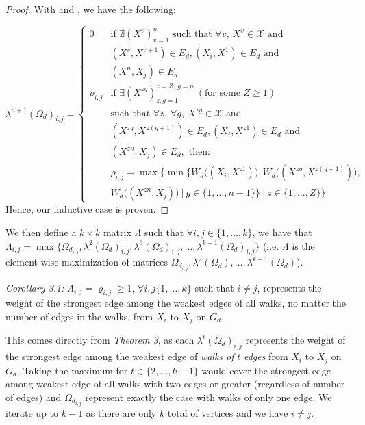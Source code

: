\documentclass{article} %
\newcommand*\circled[1]{\tikz[baseline=(char.base)]{
            \node[shape=circle,draw,inner sep=2pt] (char) {#1};}}
\begin{document}
\begin{proof}
With \circled{1} and \circled{2}, we have the following:

\[
\lambda^{n+1}(\Omega_d)_{i,j}=
\begin{cases}
0 & \textrm{if } \nexists (X^v)_{v=1}^{n} \textrm{ such that } \forall v,\ X^v\in\mathcal{X}\textrm{ and } \\
  & (X^v,X^{v+1})\in E_d, (X_i,X^1)\in E_d \textrm{ and } \\
  & (X^{n},X_j)\in E_d\\ 
\rho_{i,j} & \textrm{if }\exists (X^{zg})_{z,g=1}^{z=Z,\ g=n}\ (\textrm{for some }Z\geq1) \\
  & \textrm{such that }\forall z,\ \forall g,\ X^{zg}\in\mathcal{X} \textrm{ and } \\
  & (X^{zg},X^{z(g+1)})\in E_d, (X_i, X^{z1})\in E_d \textrm{ and } \\
  & (X^{zn},X_j)\in E_d, \textrm{ then: } \\
  & \rho_{i,j}=\max\Big\{\min\big\{W_d\big((X_i,X^{z1})\big),W_d\big((X^{zg},X^{z(g+1)})\big), \\
  & W_d\big((X^{zn},X_j)\big)\ |\ g\in\{1,\ldots,n-1\}\big\}\ |\ z\in\{1,\ldots,Z\}\Big\}
\end{cases}
\]
Hence, our inductive case is proven.
\end{proof}

We then define a $k\times k$ matrix $\Lambda$ such that $\forall i,j\in\{1,\ldots,k\}$, we have that $\Lambda_{i,j}=\max\{\Omega_{d_{i,j}},\lambda^2(\Omega_d)_{i,j},\lambda^3(\Omega_d)_{i,j},\ldots,\lambda^{k-1}(\Omega_d)_{i,j}\}$ (i.e. $\Lambda$ is the element-wise maximization of matrices $\Omega_{d_{i,j}},\lambda^2(\Omega_d),\ldots,\lambda^{k-1}(\Omega_d)$). 

\textit{Corollary 3.1:} $\Lambda_{i,j}=\varrho_{i,j}\geq1$, $\forall i,j\{1,\ldots,k\}$ such that $i\not=j$, represents the weight of the strongest edge among the weakest edges of all walks, no matter the number of edges in the walks, from $X_i$ to $X_j$ on $G_d$.

This comes directly from \textit{Theorem 3}, as each $\lambda^t(\Omega_d)_{i,j}$ represents the weight of the strongest edge among the weakest edge of \textit{walks of} $t$ \textit{edges} from $X_i$ to $X_j$ on $G_d$. Taking the maximum for $t\in\{2,\ldots,k-1\}$ would cover the strongest edge among weakest edge of all walks with two edges or greater (regardless of number of edges) and $\Omega_{d_{i,j}}$ represent exactly the case with walks of only one edge. We iterate up to $k-1$ as there are only $k$ total of vertices and we have $i\not=j$.
\end{document}
